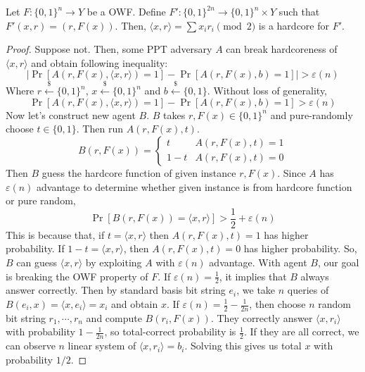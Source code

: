 \documentclass[12pt, a4paper, openany, twoside]{book}
\theoremstyle{definition}
\theoremstyle{remark}
\theoremstyle{plain}
\numberwithin{equation}{section}
\begin{document}
\begin{tcolorbox}[colback=yellow!10!white,colframe=blue!75!black,title=Goldreigh-Levin Theorem]

Let $F: \{0,1\}^n \rightarrow Y$ be a OWF. Define $F': \{0,1\}^{2n} \rightarrow \{0,1\}^n \times Y$ such that 
$F'(x, r) = (r, F(x))$. Then, $\langle x, r \rangle = \sum x_i r_i \pmod{2}$ is a hardcore for $F'$. 

\end{tcolorbox}

\begin{proof}
    
Suppose not. Then, some PPT adversary $A$ can break hardcoreness of $\langle x, r \rangle$ and obtain following inequality: 
\[\bigg|\Pr[A(r, F(x), \langle x, r \rangle) = 1] - \Pr[A(r, F(x), b) = 1]\bigg| > \varepsilon(n)\]
Where $r \xleftarrow{\$} \{0,1\}^n$, $x \xleftarrow{\$} \{0,1\}^n$ and $b \xleftarrow{\$} \{0,1\}$. 
Without loss of generality, 
\[\Pr[A(r, F(x), \langle x, r \rangle) = 1] - \Pr[A(r, F(x), b) = 1] > \varepsilon(n)\]
Now let's construct new agent $B$. $B$ takes $r, F(x) \in \{0,1\}^n$ and pure-randomly choose $t \in \{0,1\}$. 
Then run $A(r, F(x), t)$. 
\[B(r, F(x)) = \begin{cases}
    t & A(r, F(x), t) = 1 \\
    1 - t & A(r, F(x), t) = 0
\end{cases}\]
Then $B$ guess the hardcore function of given instance $r, F(x)$. Since $A$ has $\varepsilon(n)$ advantage to determine whether given instance is from hardcore function or pure random, 
\[\Pr[B(r, F(x)) = \langle x, r \rangle] > \frac{1}{2} + \varepsilon(n)\]
This is because that, if $t = \langle x, r \rangle$ then $A(r, F(x), t) = 1$ has higher probability. 
If $1 - t = \langle x, r \rangle$, then $A(r, F(x), t) = 0$ has higher probability. So, $B$ can guess $\langle x, r \rangle$ by exploiting $A$ with $\varepsilon(n)$ advantage. 
With agent $B$, our goal is breaking the OWF property of $F$. 
If $\varepsilon(n) = \frac{1}{2}$, it implies that $B$ always answer correctly. Then by standard basis bit string $e_i$, we take $n$ queries of $B(e_i, x) = \langle x, e_i \rangle = x_i$ and 
obtain $x$. If $\varepsilon(n) = \frac{1}{2} - \frac{1}{2n}$, then choose $n$ random bit string $r_1, \cdots, r_n$ and compute 
$B(r_i, F(x))$. They correctly answer $\langle x, r_i \rangle$ with probability $1 - \frac{1}{2n}$, so 
total-correct probability is $\frac{1}{2}$. If they are all correct, we can observe $n$ linear system of $\langle x, r_i \rangle = b_i$. Solving this gives us total $x$ with probability $1/2$. 

\end{proof}
\end{document}
